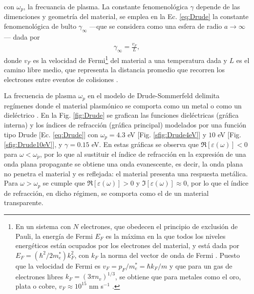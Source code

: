 %
	\begin{tcolorbox}[title = Modelo de Drude-Sommerfeld, breakable ]
	\end{tcolorbox}\vspace*{-.75em}\noindent
%
con $\omega_p$, la frecuancia de plasma. La constante fenomenológica $\gamma$ depende de las dimenciones y geometría del material, se emplea en la Ec. \eqref{eq:Drude} la constante fenomenológica de bulto $\gamma_\infty$ ---que se considera como una esfera de radio $a\to\infty$--- dada por \cite{kreibig1995clusters} 
	\begin{align}
	\gamma_\infty = \frac{v_F}{L},
			 \label{eq:gammaInf}	
	\end{align}
donde $v_F$ es la velocidad de Fermi\footnote{En un sistema con $N$ electrones, que obedecen el principio  de exclusión de Pauli, la energía de Fermi $E_F$ es la máxima en la que todos los niveles energéticos están ocupados por los electrones del material, y está dada por $E_F = (\hbar^2/2m_e^*)k_F^2$, con $k_F$ la norma del vector de onda de Fermi \cite{gross2014festkorperphysik}.  Puesto que la velocidad de Fermi es $v_F = p_F/m_e^* = \hbar k_F / m$ y que para un gas de electrones libres $k_F=(3\pi n_v)^{1/3}$, se obtiene que para metales como el oro, plata o cobre,  $v_F\approx 10^{15}$ nm s$^{-1}$ \cite{gross2014festkorperphysik,ashcroft1976solid}. } del material a una temperatura dada y $L$ es el camino libre medio, que representa la distancia promedio que recorren los electrones entre eventos de colisiones \cite{gross2014festkorperphysik}.  

La frecuencia de plasma $\omega_p$ en el modelo de Drude-Sommerfeld delimita regímenes donde el material plasmónico se comporta como un metal o como un dieléctrico \cite{trugler2011properties}.  En la Fig.  \ref{fig:Drude} se grafican las funciones dieléctricas (gráfica interna) y los índices de refracción  (gráfica principal) modelados por una función tipo Drude [Ec. \eqref{eq:Drude}] con $\omega_p=4. 3$ eV [Fig.  \ref{sfig:Drude4eV}] y $10$ eV [Fig.  \ref{sfig:Drude10eV}], y $\gamma=0. 15$ eV.  En estas gráficas se observa que $\Re[\varepsilon(\omega)]<0$ para $\omega<\omega_p$, por lo que al sustituir el índice de refracción en la expresión de una onda plana propagante se obtiene una onda evanescente, es decir, la onda plana no penetra el material y es reflejada: el material presenta una respuesta metálica.  Para $\omega>\omega_p$ se cumple que $\Re[\varepsilon(\omega)]>0$ y $\Im[\varepsilon(\omega)]\approx 0$, por lo que el índice de refracción, en dicho régimen, se comporta como el de un  material transparente. 

